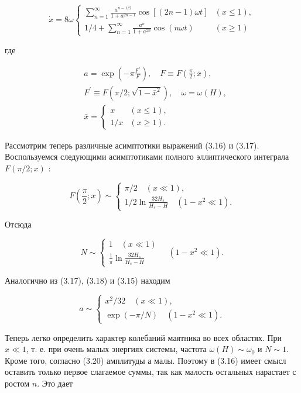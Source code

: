 \documentclass[10pt]{article}
\begin{document}
\[
\dot{x}=8 \omega \begin{cases}\sum_{n=1}^{\infty} \frac{a^{n-1 / 2}}{1+a^{2 n-1}} \cos [(2 n-1) \omega t] & (x \leqslant 1),  \tag{3.16}\\ 1 / 4+\sum_{n=1}^{\infty} \frac{a^{n}}{1+a^{2 n}} \cos (n \omega t) & (x \geqslant 1)\end{cases}
\]

где


\begin{align*}
& a=\exp \left(-\pi \frac{F^{\prime}}{F}\right), \quad F \equiv F\left(\frac{\pi}{2} ; \bar{x}\right), \\
& F^{\prime} \equiv F\left(\pi / 2 ; \sqrt{1-\bar{x}^{2}}\right), \quad \omega=\omega(H),  \tag{3.17}\\
& \bar{x}= \begin{cases}x & (x \leqslant 1), \\
1 / x & (x \geqslant 1) .\end{cases}
\end{align*}


Рассмотрим теперь различные асимптотики выражений (3.16) и (3.17). Воспользуемся следующими асимптотиками полного эллиптического интеграла $F(\pi / 2 ; x)$ :

\[
F\left(\frac{\pi}{2} ; x\right) \sim\left\{\begin{array}{l}
\pi / 2 \quad(x \ll 1),  \tag{3.18}\\
1 / 2 \ln \frac{32 H_{s}}{H_{s}-H} \quad\left(1-x^{2} \ll 1\right) .
\end{array}\right.
\]

Отсюда

\[
N \sim\left\{\begin{array}{l}
1 \quad(x \ll 1)  \tag{3.19}\\
\frac{1}{\pi} \ln \frac{32 H_{s}}{H_{s}-H}
\end{array} \quad\left(1-x^{2} \ll 1\right) .\right.
\]

Аналогично из (3.17), (3.18) и (3.15) находим

\[
a \sim\left\{\begin{array}{l}
x^{2} / 32 \quad(x \ll 1),  \tag{3.20}\\
\exp (-\pi / N) \quad\left(1-x^{2} \ll 1\right) .
\end{array}\right.
\]

Теперь легко определить характер колебаний маятника во всех областях. При $x \ll 1$, т. е. при очень малых энергиях системы, частота $\omega(H) \sim \omega_{0}$ и $N \sim 1$. Кроме того, согласно (3.20) амплитуды $а$ малы. Поэтому в (3.16) имеет смысл оставить только первое слагаемое суммы, так как малость остальных нарастает с ростом $n$. Это дает
\end{document}
